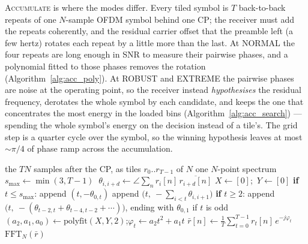 \textsc{Accumulate} is where the modes differ.  Every tiled symbol is
$T$ back-to-back repeats of one $N$-sample OFDM symbol behind one CP;
the receiver must add the repeats coherently, and the residual carrier
offset that the preamble left (a few hertz) rotates each repeat by a
little more than the last.  At NORMAL the four repeats are long enough
in SNR to measure their pairwise phases, and a polynomial fitted to
those phases removes the rotation (Algorithm~\ref{alg:acc_poly}).  At
ROBUST and EXTREME the pairwise phases are noise at the operating
point, so the receiver instead \emph{hypothesises} the residual
frequency, derotates the whole symbol by each candidate, and keeps the
one that concentrates the most energy in the loaded bins
(Algorithm~\ref{alg:acc_search}) --- spending the whole symbol's
energy on the decision instead of a tile's.  The grid step is a quarter
cycle over the symbol, so the winning hypothesis leaves at most
$\sim\pi/4$ of phase ramp across the accumulation.

\begin{algorithm}[H]
\caption{\textsc{Accumulate}, NORMAL ($T = 4$): polynomial phase tracker (\texttt{TiledOFDMModem.\_demodulate\_signal}).}
\label{alg:acc_poly}
\begin{algorithmic}[1]
\Require the $TN$ samples after the CP, as tiles $r_0 .. r_{T-1}$ of $N$
\Ensure one $N$-point spectrum
\State $s_{\max} \gets \min(3, T{-}1)$
 $\ \theta_{i,i+d} \gets \angle \sum_n r_i[n]\, \overline{r_{i+d}[n]}$  \EndFor
\State $X \gets [0]$;\ $Y \gets [0]$ 
    \State \textbf{if} $t \le s_{\max}$: append $(t, -\theta_{0,t})$ 
    \State append $\big(t,\ -\sum_{i<t} \theta_{i,i+1}\big)$ 
    \State \textbf{if} $t \ge 2$: append $\big(t,\ -(\theta_{t-2,t} + \theta_{t-4,t-2} + \cdots)\big)$, ending with $\theta_{0,1}$ if $t$ is odd 
\EndFor
\State $(a_2, a_1, a_0) \gets \mathrm{polyfit}(X, Y, 2)$;\quad $\varphi_t \gets a_2 t^2 + a_1 t$ 
\State $\bar r[n] \gets \frac{1}{T} \sum_{t=0}^{T-1} r_t[n]\, e^{-j\varphi_t}$ 
\State \Return $\mathrm{FFT}_N(\bar r)$
\end{algorithmic}
\end{algorithm}

